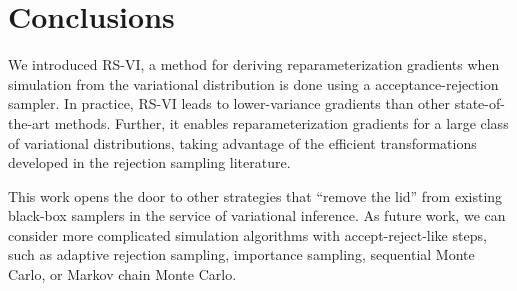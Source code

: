 
\section{Conclusions}
\glsresetall

We introduced \gls{RS-VI}, a method for deriving reparameterization
gradients when simulation from the variational distribution is done
using a acceptance-rejection sampler.  In practice, \gls{RS-VI} leads to
lower-variance gradients than other state-of-the-art methods.
Further, it enables reparameterization gradients for a large class of
variational distributions, taking advantage of the efficient
transformations developed in the rejection sampling literature.

This work opens the door to other strategies that ``remove the lid''
from existing black-box samplers in the service of variational
inference.  As future work, we can consider more complicated
simulation algorithms with accept-reject-like steps, such as adaptive
rejection sampling, importance sampling, sequential Monte Carlo, or
Markov chain Monte Carlo.





